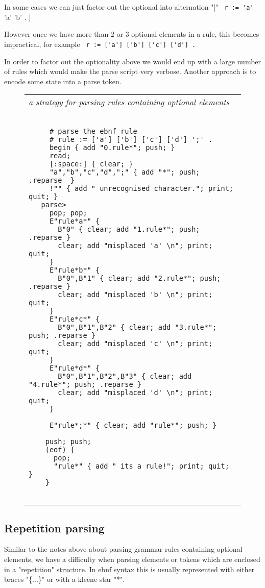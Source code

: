 \documentclass[a4paper,12pt]{article}
\begin{document}
  In some cases we can just factor out the optional into alternation "|" 
 \verb| r := 'a' | 'a' 'b' . |


  However once we have more than 2 or 3 optional elements in a rule, this
  becomes impractical, for example 
 \verb| r := ['a'] ['b'] ['c'] ['d'] . |

  
  In order to factor out the optionality above we would end up with
  a large number of rules which would make the parse script very verbose.
  Another approach is to encode some state into a parse token.
 \begin{figure}
 \begin{tabular}{ l }
 \emph{ a strategy for parsing rules containing optional elements } \\ 
 \begin{lstlisting}[breaklines] 

     # parse the ebnf rule
     # rule := ['a'] ['b'] ['c'] ['d'] ';' .
     begin { add "0.rule*"; push; }
     read;
     [:space:] { clear; }
     "a","b","c","d",";" { add "*"; push; .reparse  }
     !"" { add " unrecognised character."; print; quit; }
   parse>
     pop; pop;
     E"rule*a*" { 
       B"0" { clear; add "1.rule*"; push; .reparse }
       clear; add "misplaced 'a' \n"; print; quit; 
     } 
     E"rule*b*" { 
       B"0",B"1" { clear; add "2.rule*"; push; .reparse }
       clear; add "misplaced 'b' \n"; print; quit; 
     } 
     E"rule*c*" { 
       B"0",B"1",B"2" { clear; add "3.rule*"; push; .reparse }
       clear; add "misplaced 'c' \n"; print; quit; 
     }
     E"rule*d*" { 
       B"0",B"1",B"2",B"3" { clear; add "4.rule*"; push; .reparse }
       clear; add "misplaced 'd' \n"; print; quit; 
     }

     E"rule*;*" { clear; add "rule*"; push; }

    push; push;
    (eof) {
      pop; 
      "rule*" { add " its a rule!"; print; quit; }
    } 
   
 \end{lstlisting} 
 \end{tabular} 

 \end{figure}

\subsection{Repetition parsing}

  Similar to the notes above about parsing grammar rules containing
  optional elements, we have a difficulty when parsing elements or
  tokens which are enclosed in a "repetition" structure. In ebnf
  syntax this is usually represented with either braces "\{...\}" or
  with a kleene star "*".
\end{document}
